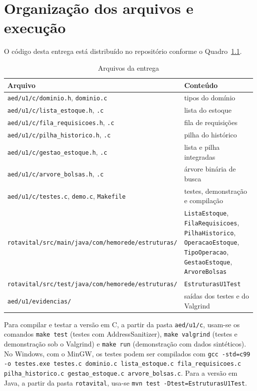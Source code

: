 \documentclass[12pt,a4paper,oneside]{report}
\newcommand{\fonte}[1][Elaborado pelos autores (2026).]{\par\vspace{2pt}{\centering\small Fonte: #1\par}\vspace{6pt}}
\newcommand{\cod}[1]{\texttt{#1}}
\begin{document}
\appendix
\renewcommand{\thechapter}{\Alph{chapter}}
\titleformat{\chapter}[hang]{\normalfont\bfseries}{APÊNDICE \thechapter\ --}{0.4em}{\MakeUppercase}
\chapter{Organização dos arquivos e execução}

O código desta entrega está distribuído no repositório conforme o Quadro~\ref{qd:arquivos}.

\begin{table}[H]
\renewcommand{\tablename}{Quadro}
\caption{Arquivos da entrega}
\label{qd:arquivos}
\small
\begin{tabularx}{\textwidth}{@{}p{7.2cm}X@{}}
\toprule
\textbf{Arquivo} & \textbf{Conteúdo} \\
\midrule
\cod{aed/u1/c/dominio.h}, \cod{dominio.c} & tipos do domínio \\
\cod{aed/u1/c/lista\_estoque.h}, \cod{.c} & lista do estoque \\
\cod{aed/u1/c/fila\_requisicoes.h}, \cod{.c} & fila de requisições \\
\cod{aed/u1/c/pilha\_historico.h}, \cod{.c} & pilha do histórico \\
\cod{aed/u1/c/gestao\_estoque.h}, \cod{.c} & lista e pilha integradas \\
\cod{aed/u1/c/arvore\_bolsas.h}, \cod{.c} & árvore binária de busca \\
\cod{aed/u1/c/testes.c}, \cod{demo.c}, \cod{Makefile} & testes, demonstração e compilação \\
\cod{rotavital/src/main/java/}\newline\cod{com/hemorede/estruturas/} & \cod{ListaEstoque}, \cod{FilaRequisicoes}, \cod{PilhaHistorico}, \cod{OperacaoEstoque}, \cod{TipoOperacao}, \cod{GestaoEstoque}, \cod{ArvoreBolsas} \\
\cod{rotavital/src/test/java/}\newline\cod{com/hemorede/estruturas/} & \cod{EstruturasU1Test} \\
\cod{aed/u1/evidencias/} & saídas dos testes e do Valgrind \\
\bottomrule
\end{tabularx}
\fonte
\end{table}

Para compilar e testar a versão em C, a partir da pasta \cod{aed/u1/c}, usam-se os comandos \cod{make test} (testes com AddressSanitizer), \cod{make valgrind} (testes e demonstração sob o Valgrind) e \cod{make run} (demonstração com dados sintéticos). No Windows, com o MinGW, os testes podem ser compilados com \cod{gcc -std=c99 -o testes.exe testes.c dominio.c lista\_estoque.c fila\_requisicoes.c pilha\_historico.c gestao\_estoque.c arvore\_bolsas.c}. Para a versão em Java, a partir da pasta \cod{rotavital}, usa-se \cod{mvn test -Dtest=EstruturasU1Test}.
\end{document}

